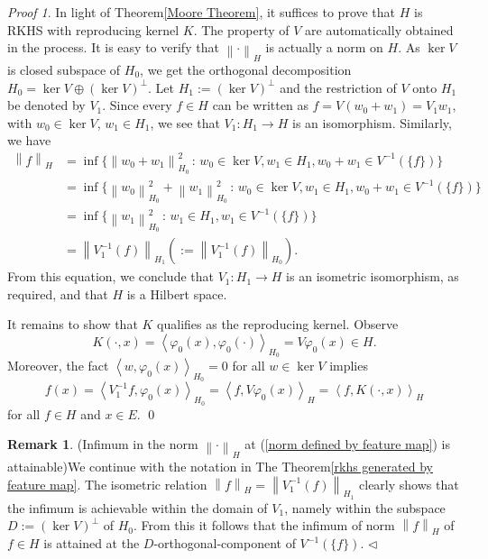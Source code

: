 \documentclass[a4paper,12pt]{article}
\theoremstyle{remark}
\newtheorem*{prf}{Proof}
\theoremstyle{definition}
\newtheorem{rem}[thm]{Remark}
\theoremstyle{definition}
\theoremstyle{definition}
\newcommand{\ip}[2]{\left<#1, #2 \right>}
\newcommand{\norm}[1]{\left\| #1 \right\|}
\newcommand{\fin}{\hfill \( \triangleleft \) }
\begin{document}
\begin{prf}
	In light of Theorem\ref{Moore Theorem}, it suffices to prove that \( H \) is RKHS with reproducing kernel \( K \). The property of \( V \) are automatically obtained in the process. It is easy to verify that \( \norm{\cdot }_H \) is actually a norm on \( H \). As \( \ker V \) is closed subspace of \( H_0 \), we get the orthogonal decomposition \( H_0 = \ker V \oplus \left( \ker V \right)^{\perp} \). Let \( H_1 := \left( \ker V \right)^{\perp} \) and the restriction of \( V \) onto \( H_1 \) be denoted by \( V_1 \). Since every \( f \in H \) can be written as \( f = V(w_0+w_1) = V_1 w_1 \), with \( w_0 \in \ker V \), \( w_1 \in H_1 \),  we see that \( V_1 :H_1 \to H \) is an isomorphism. Similarly, we have
	\begin{equation*}
		\begin{aligned}
			\norm{f}_H
			 & = \inf \{ \norm{w_0+w_1}_{H_0} ^2 \,:\, w_0 \in \ker V, w_1 \in H_1, w_0 + w_1 \in V^{-1}(\{f\})\}                 \\
			 & = \inf \{ \norm{w_0}_{H_0}^2 + \norm{w_1}_{H_0}^2 \,:\, w_0 \in \ker V, w_1 \in H_1, w_0 + w_1 \in V^{-1}(\{f\})\} \\
			 & = \inf \{ \norm{w_1}_{H_0}^2 \,:\, w_1 \in H_1, w_1 \in V^{-1}(\{f\})\}                                            \\
			 & = \norm{V_1^{-1}(f)}_{H_1} \left( := \norm{V_1^{-1}(f)}_{H_0} \right).
		\end{aligned}
	\end{equation*}
	From this equation, we conclude that \( V_1 :H_1 \to H \) is an isometric isomorphism, as required, and that \( H \) is a Hilbert space.

	It remains to show that \( K \) qualifies as the reproducing kernel. Observe
	\begin{equation*}
		K(\cdot ,x) = \ip{\varphi_0(x)}{\varphi_0(\cdot )}_{H_0} = V \varphi_0(x)\in H.
	\end{equation*}
	Moreover, the fact \( \ip{w}{\varphi_0(x)}_{H_0} = 0 \) for all \( w \in \ker V \) implies
	\begin{equation*}
		f(x) = \ip{V_1^{-1}f}{\varphi_0(x)}_{H_0} = \ip{f}{V \varphi_0(x)}_H = \ip{f}{K(\cdot ,x)}_H
	\end{equation*}
	for all \( f \in H \) and \( x \in E \).
	\qed\end{prf}
\begin{rem} (Infimum in the norm \( \norm{\cdot }_H \) at (\ref{norm defined by feature map}) is attainable)\label{remark attainablity of norm induced by feature map}
	We continue with the notation in The Theorem\ref{rkhs generated by feature map}. The isometric relation \( \norm{f}_H = \norm{V_1^{-1}(f)}_{H_1}\) clearly shows that the infimum is achievable within the domain of \( V_1 \), namely within the subspace \( D:=(\ker V)^{\perp } \) of \( H_0 \). From this it follows that the infimum of norm \( \norm{f}_H \) of \( f \in H \) is attained at the \( D \)-orthogonal-component of \( V^{-1}(\{f\}) \).
	\fin\end{rem}
\end{document}

